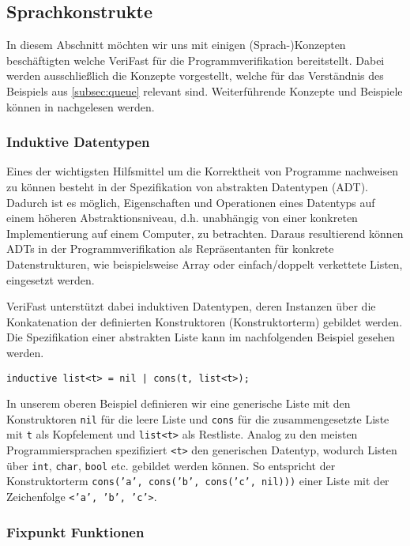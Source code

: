 \subsection{Sprachkonstrukte}

In diesem Abschnitt möchten wir uns mit einigen (Sprach-)Konzepten beschäftigten welche VeriFast für die Programmverifikation bereitstellt. Dabei werden ausschließlich die Konzepte vorgestellt, welche für das Verständnis des Beispiels aus \cref{subsec:queue} relevant sind. Weiterführende Konzepte und Beispiele können in \cite{Jacobs2017} nachgelesen werden.

\subsubsection{Induktive Datentypen}
\label{subsec:adt}

Eines der wichtigsten Hilfsmittel um die Korrektheit von Programme nachweisen zu können besteht in der Spezifikation von abstrakten Datentypen (ADT). Dadurch ist es möglich, Eigenschaften und Operationen eines Datentyps auf einem höheren Abstraktionsniveau, d.h. unabhängig von einer konkreten Implementierung auf einem Computer, zu betrachten. Daraus resultierend können ADTs in der Programmverifikation als Repräsentanten für konkrete Datenstrukturen, wie beispielsweise Array oder einfach/doppelt verkettete Listen, eingesetzt werden. \cite[S. 265]{Saake2014}

VeriFast unterstützt dabei induktiven Datentypen, deren Instanzen über die Konkatenation der definierten Konstruktoren (Konstruktorterm) gebildet werden. Die Spezifikation einer abstrakten Liste kann im nachfolgenden Beispiel gesehen werden.

\begin{lstlisting}
inductive list<t> = nil | cons(t, list<t>);
\end{lstlisting}

\noindent
In unserem oberen Beispiel definieren wir eine generische Liste mit den Konstruktoren \texttt{nil} für die leere Liste und \texttt{cons} für die zusammengesetzte Liste mit \texttt{t} als Kopfelement und \texttt{list<t>} als Restliste. Analog zu den meisten Programmiersprachen spezifiziert \texttt{<t>} den generischen Datentyp, wodurch Listen über \texttt{int}, \texttt{char}, \texttt{bool} etc. gebildet werden können. So entspricht der Konstruktorterm \texttt{cons('a', cons('b', cons('c', nil)))} einer Liste mit der Zeichenfolge \texttt{<'a', 'b', 'c'>}.

\subsubsection{Fixpunkt Funktionen}

